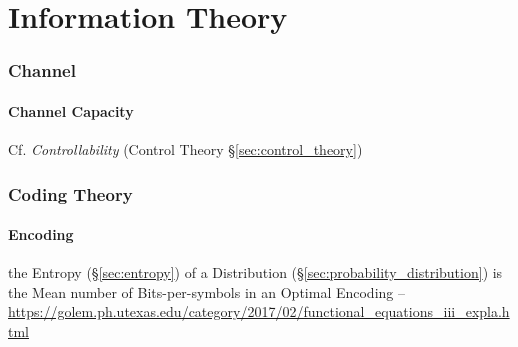 \part{Information Theory}\label{part:information_theory} \cite{shannon48}

\section{Channel}\label{sec:channel}

\subsection{Channel Capacity}\label{sec:channel_capacity}

\fist Cf. \emph{Controllability} (Control Theory
\S\ref{sec:control_theory})



\section{Coding Theory}\label{sec:coding_theory}

\subsection{Encoding}\label{sec:encoding}

the Entropy (\S\ref{sec:entropy}) of a Distribution
(\S\ref{sec:probability_distribution}) is the Mean number of
Bits-per-symbols in an Optimal Encoding --
\url{https://golem.ph.utexas.edu/category/2017/02/functional_equations_iii_expla.html}



